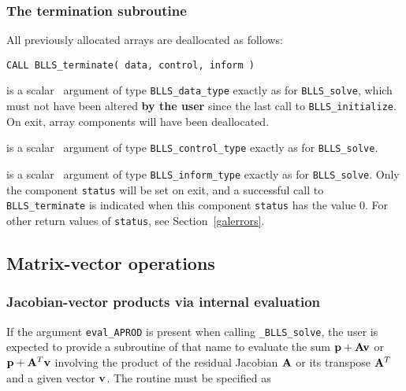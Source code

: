 \documentclass{galahad}
\newcommand{\packagename}{BLLS}
\newcommand{\fullpackagename}{\libraryname\_\packagename}
\newcommand{\solver}{{\tt \fullpackagename\_solve}}
\begin{document}

\subsubsection{The  termination subroutine}
All previously allocated arrays are deallocated as follows:
\vspace*{1mm}

\hspace{8mm}
{\tt CALL \packagename\_terminate( data, control, inform )}

\vspace*{-3mm}
\begin{description}

 is a scalar \intentinout\ argument of type
{\tt \packagename\_data\_type}
exactly as for
{\tt \packagename\_solve},
which must not have been altered {\bf by the user} since the last call to
{\tt \packagename\_initialize}.
On exit, array components will have been deallocated.

 is a scalar \intentin\ argument of type
{\tt \packagename\_control\_type}
exactly as for
{\tt \packagename\_solve}.

 is a scalar \intentout\ argument of type
{\tt \packagename\_inform\_type}
exactly as for
{\tt \packagename\_solve}.
Only the component {\tt status} will be set on exit, and a
successful call to
{\tt \packagename\_terminate}
is indicated when this  component {\tt status} has the value 0.
For other return values of {\tt status}, see Section~\ref{galerrors}.

\end{description}



\subsection{Matrix-vector operations\label{fdv}}


\subsubsection{Jacobian-vector products via internal evaluation\label{jvp}}

If the argument {\tt eval\_APROD} is present when calling \solver, the
user is expected to provide a subroutine of that name to evaluate the
sum ${\mathbf{p}} + {\mathbf{A}} {\mathbf{v}}$ or ${\mathbf{p}} + {\mathbf{A}}^T{\mathbf{v}}$ involving the
product of the residual Jacobian ${\mathbf{A}}$ or its transpose ${\mathbf{A}}^T$
and a given vector ${\mathbf{v}}$.
The routine must be specified as
\end{document}
